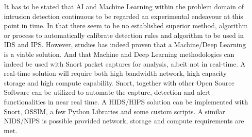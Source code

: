 It has to be stated that AI and Machine Learning within the problem domain of intrusion detection continuous to be regarded an experimental\cite{Parisi2019} endeavour at this point in time. In that there seem to be no established superior method, algorithm or process to automatically calibrate detection rules and algorithm to be used in IDS and IPS. However, studies has indeed proven that a Machine/Deep Learning is a viable solution. And that Machine and Deep Learning methodologies can indeed be used with Snort packet captures for analysis, albeit not in real-time. A real-time solution will require both high bandwidth network, high capacity storage and high compute capability. Snort, together with other Open Source Software can be utilized to automate the capture, detection and alert functionalities in near real time. A HIDS/HIPS solution can be implemented with Snort, OSSIM, a few Python Libraries and some custom scripts. A similar NIDS/NIPS is possible provided network, storage and compute requirements are met.
\\